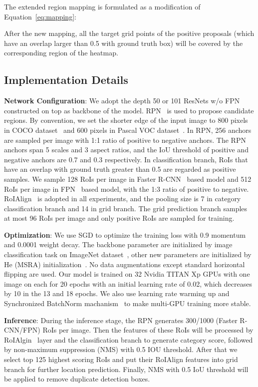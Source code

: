 \documentclass[10pt,twocolumn,letterpaper]{article}
\begin{document}
The extended region mapping is formulated as a modification of Equation~\ref{eq:mapping}:

After the new mapping, all the target grid points of the positive proposals (which have an overlap larger than 0.5 with ground truth box) will be covered by the corresponding region of the heatmap.

\subsection{Implementation Details}
\textbf{Network Configuration}: We adopt the depth 50 or 101 ResNets \cite{he2016deep} w/o FPN~\cite{lin2017feature} constructed on top as backbone of the model. RPN~\cite{ren2015faster} is used to propose candidate regions. By convention, we set the shorter edge of the input image to 800 pixels in COCO dataset~\cite{lin2014microsoft} and 600 pixels in Pascal VOC dataset~\cite{everingham2015pascal}. In RPN, 256 anchors are sampled per image with 1:1 ratio of positive to negative anchors. The RPN anchors span 5 scales and 3 aspect ratios, and the IoU threshold of positive and negative anchors are 0.7 and 0.3 respectively. In classification branch, RoIs that have an overlap with ground truth greater than 0.5 are regarded as positive samples. We sample 128 RoIs per image in Faster R-CNN~\cite{ren2015faster} based model and 512 RoIs per image in FPN~\cite{lin2017feature} based model, with the 1:3 ratio of positive to negative. RoIAlign~\cite{he2017mask} is adopted in all experiments, and the pooling size is 7 in category classification branch and 14 in grid branch. The grid prediction branch samples at most 96 RoIs per image and only positive RoIs are sampled for training.


\textbf{Optimization}: We use SGD to optimize the training loss with 0.9 momentum and 0.0001 weight decay. The backbone parameter are initialized by image classification task on ImageNet dataset~\cite{russakovsky2015imagenet}, other new parameters are initialized by He (MSRA) initialization~\cite{HeZR015}. No data augmentations except standard horizontal flipping are used.
Our model is trained on 32 Nvidia TITAN Xp GPUs with one image on each for 20 epochs with an initial learning rate of 0.02, which decreases by 10 in the 13 and 18 epochs. We also use learning rate warming up and Synchronized BatchNorm machanism~\cite{goyal2017accurate,peng2017megdet} to make multi-GPU training more stable.

\textbf{Inference}: During the inference stage, the RPN generates 300/1000 (Faster R-CNN/FPN) RoIs per image. Then the features of these RoIs will be processed by RoIAlgin~\cite{he2017mask} layer and the classification branch to generate category score, followed by non-maximum suppression (NMS) with 0.5 IOU threshold. After that we select top 125 highest scoring RoIs and put their RoIAlign features into grid branch for further location prediction. Finally, NMS with 0.5 IoU threshold will be applied to remove duplicate detection boxes.
\end{document}
